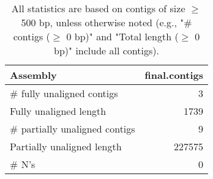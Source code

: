 \documentclass[12pt,a4paper]{article}
\begin{document}
\begin{table}[ht]
\begin{center}
\caption{All statistics are based on contigs of size $\geq$ 500 bp, unless otherwise noted (e.g., "\# contigs ($\geq$ 0 bp)" and "Total length ($\geq$ 0 bp)" include all contigs).}
\begin{tabular}{|l*{1}{|r}|}
\hline
Assembly & final.contigs \\ \hline
\# fully unaligned contigs & 3 \\ \hline
Fully unaligned length & 1739 \\ \hline
\# partially unaligned contigs & 9 \\ \hline
Partially unaligned length & 227575 \\ \hline
\# N's & 0 \\ \hline
\end{tabular}
\end{center}
\end{table}
\end{document}
